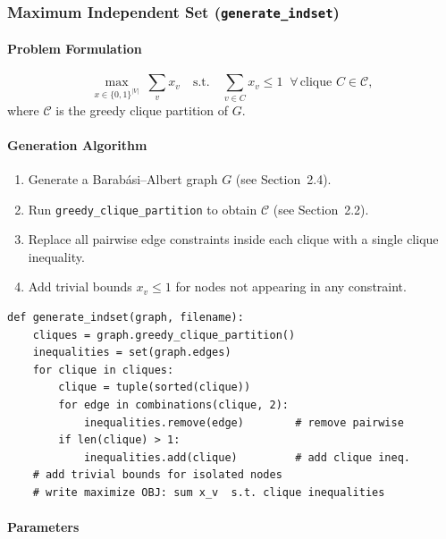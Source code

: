 \subsubsection{Maximum Independent Set (\texttt{generate\_indset})}

\paragraph{Problem Formulation}

\begin{equation}
    \max_{x \in \{0,1\}^{|V|}}\; \sum_v x_v \quad \text{s.t.}\quad \sum_{v \in C} x_v \leq 1\;\;\forall\,\text{clique } C \in \mathcal{C},
\end{equation}
where $\mathcal{C}$ is the greedy clique partition of $G$.

\paragraph{Generation Algorithm}

\begin{enumerate}
    \item Generate a Barab\'asi--Albert graph $G$ (see Section~2.4).
    \item Run \texttt{greedy\_clique\_partition} to obtain $\mathcal{C}$ (see Section~2.2).
    \item Replace all pairwise edge constraints inside each clique with a single clique inequality.
    \item Add trivial bounds $x_v \leq 1$ for nodes not appearing in any constraint.
\end{enumerate}

\begin{lstlisting}
def generate_indset(graph, filename):
    cliques = graph.greedy_clique_partition()
    inequalities = set(graph.edges)
    for clique in cliques:
        clique = tuple(sorted(clique))
        for edge in combinations(clique, 2):
            inequalities.remove(edge)        # remove pairwise
        if len(clique) > 1:
            inequalities.add(clique)         # add clique ineq.
    # add trivial bounds for isolated nodes
    # write maximize OBJ: sum x_v  s.t. clique inequalities
\end{lstlisting}

\paragraph{Parameters}

